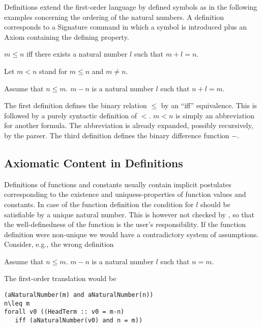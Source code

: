 \documentclass[11pt]{article}
\begin{document}
Definitions extend the first-order language by defined symbols
as in the following examples concerning the ordering
of the natural numbers. A definition corresponds to a 
Signature command in which a symbol is introduced plus
an Axiom containing the defining property.

\begin{forthel}

\begin{definition} $m \leq n$ iff 
there exists a natural number $l$ such that  
$m + l = n$.
\end{definition}

Let $m < n$ stand for $m \leq n$ and $m \neq n$.

\begin{definition} Assume that $n \leq m$.
$m - n$ is a natural number $l$ such that $n + l  = m$.
\end{definition}

\end{forthel}

The first definition defines the binary relation $\leq$ by an
``iff'' equivalence. This is followed by a purely 
syntactic definition of $<$. $m < n$ is simply an abbreviation
for another formula. The abbreviation is already expanded,
possibly recursively, by the parser. The third definition
defines the binary difference function $-$.

\subsection{Axiomatic Content in Definitions}

Definitions of functions and constants usually contain 
implicit postulates corresponding to the existence
and uniquess-properties of function values and constants. In case of
the function definition the condition for $l$ should be
satisfiable by a unique natural number. This is however not
checked by \Naproche, so that the well-definedness of the
function is the user's responsibility. If the function
definition were non-unique we would have a contradictory
system of assumptions. Consider, e.g., the wrong definition

\begin{definition} Assume that $n \leq m$.
$m - n$ is a natural number $l$ such that $n = m$.
\end{definition}

The first-order translation would be

\begin{verbatim}
(aNaturalNumber(m) and aNaturalNumber(n))
n\leq m
forall v0 ((HeadTerm :: v0 = m-n) 
   iff (aNaturalNumber(v0) and n = m))
\end{verbatim}
\end{document}

